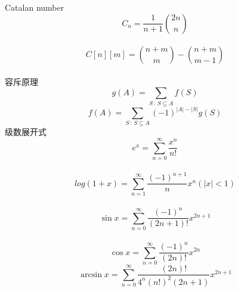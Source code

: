 Catalan number\\
\[C_n = \frac{1}{n+1}{2n \choose n} \] \\
\[C[n][m] = {n+m \choose m} - {n+m \choose m-1} \]\\
容斥原理\\
\[g(A)=\sum_{S\,:\,S\subseteq A}f(S)\]
\[f(A)=\sum_{S\,:\,S\subseteq A}(-1)^{\left|A\right|-\left|S\right|}g(S)\]
级数展开式
	\[ e^x = \sum\limits_{n=0}^{\infty} \frac{x^n}{n!} \] \\
	\[ log(1+x) = \sum\limits_{n=1}^{\infty} \frac{(-1)^{n+1}}{n}x^n (|x| < 1) \] \\
	\[ \sin x = \sum\limits_{n=0}^{\infty} \frac{(-1)^n}{(2n+1)!}x^{2n+1} \] \\
	\[ \cos x = \sum\limits_{n=0}^{\infty} \frac{(-1)^n}{(2n)!}x^{2n} \]
	\[ \arcsin x = \sum\limits_{n=0}^{\infty} \frac{(2n)!}{4^n(n!)^2(2n+1)} x^{2n+1} \] \\